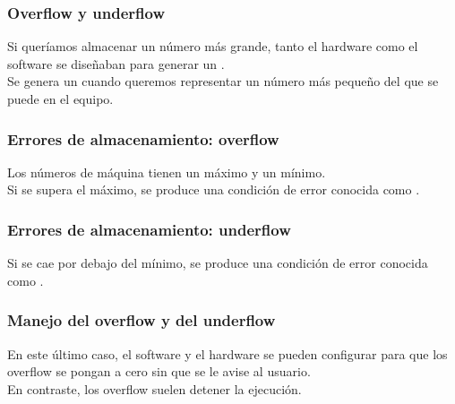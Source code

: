 \documentclass[12pt]{beamer}
\begin{document}
\begin{frame}
\frametitle{Overflow y underflow}
Si queríamos almacenar un número más grande, tanto el hardware como el software se diseñaban para generar un .
\\
\bigskip
\pause
Se genera un  cuando queremos representar un número más pequeño del que se puede en el equipo.
\end{frame}
\begin{frame}
\frametitle{Errores de almacenamiento: overflow}
Los números de máquina tienen un máximo y un mínimo.
\\
\bigskip
Si se supera el máximo, se produce una condición de error conocida como .
\begin{figure}
\centering

\end{figure}
\end{frame}
\begin{frame}
\frametitle{Errores de almacenamiento: underflow}
\begin{figure}
\centering

\end{figure}
Si se cae por debajo del mínimo, se produce una condición de error conocida como .
\end{frame}
\begin{frame}
\frametitle{Manejo del overflow y del underflow}
En este último caso, el software y el hardware se pueden configurar para que los overflow se pongan a cero sin que se le avise al usuario.
\\
\bigskip
\pause
En contraste, los overflow suelen detener la ejecución.
\end{frame}


\end{document}
